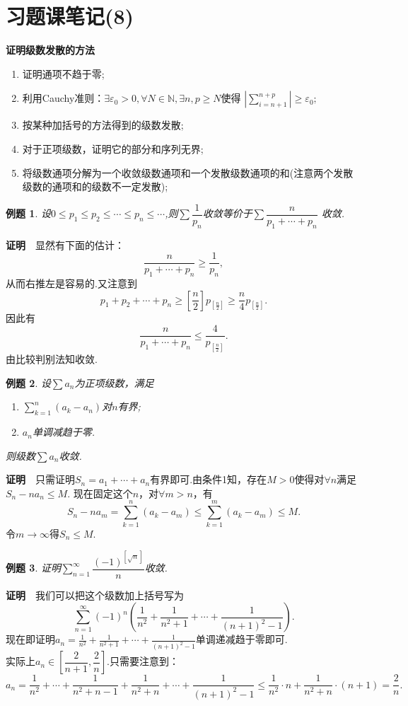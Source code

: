 \documentclass[UTF8]{article}
\newcommand{\zm}{\textbf{证明}$\quad$}
\newtheorem{exa}{\hspace{2em}例题}[section]
\begin{document}
\section{习题课笔记(8)}
\textbf{证明级数发散的方法}
\begin{enumerate}
  \item 证明通项不趋于零;
  \item 利用Cauchy准则：$\exists\varepsilon_0>0,\forall N\in \mathbb{N},\exists n,p\ge N$使得
  $|\sum_{i=n+1}^{n+p}|\ge\varepsilon_0;$
  \item 按某种加括号的方法得到的级数发散;
  \item 对于正项级数，证明它的部分和序列无界;
  \item 将级数通项分解为一个收敛级数通项和一个发散级数通项的和(注意两个发散级数的通项和的级数不一定发散);
\end{enumerate}
\begin{exa}
  设$0\le p_1\le p_2\le\cdots\le p_n\le\cdots$,则$\sum\dfrac{1}{p_n}$收敛等价于$\sum\dfrac{n}{p_1+\cdots+p_n}$
  收敛.
\end{exa}
\zm 显然有下面的估计：
$$\frac{n}{p_1+\cdots+p_n}\ge\frac{1}{p_n},$$
从而右推左是容易的.又注意到
$$p_1+p_2+\cdots+p_n\ge[\frac{n}{2}]p_{[\frac{n}{2}]}\ge\frac{n}{4}p_{[\frac{n}{2}]}.$$
因此有
$$\frac{n}{p_1+\cdots+p_n}\le\frac{4}{p_{[\frac{n}{2}]}}.$$
由比较判别法知收敛.
\begin{exa}
  设$\sum a_n$为正项级数，满足
  \begin{enumerate}
    \item $\sum_{k=1}^n(a_k-a_n)$对$n$有界;
    \item $a_n$单调减趋于零.
  \end{enumerate}
  则级数$\sum a_n$收敛.
\end{exa}
\zm 只需证明$S_n=a_1+\cdots+a_n$有界即可.由条件1知，存在$M>0$使得对$\forall n$满足$S_n-na_n\le M.$
现在固定这个$n$，对$\forall m>n$，有
$$S_n-na_m=\sum_{k=1}^n(a_k-a_m)\le\sum_{k=1}^m(a_k-a_m)\le M.$$
令$m\to\infty$得$S_n\le M.$
\begin{exa}
  证明$\sum\limits_{n=1}^\infty\dfrac{(-1)^{[\sqrt{n}]}}{n}$收敛.
\end{exa}
\zm 我们可以把这个级数加上括号写为
$$\sum_{n=1}^\infty (-1)^n\left(\frac{1}{n^2}+\frac{1}{n^2+1}+\cdots+\frac{1}{(n+1)^2-1}\right).$$
现在即证明$a_n=\frac{1}{n^2}+\frac{1}{n^2+1}+\cdots+\frac{1}{(n+1)^2-1}$单调递减趋于零即可.\\
实际上$a_n\in[\dfrac{2}{n+1},\dfrac{2}{n}].$只需要注意到：
$$a_n=\frac{1}{n^2}+\cdots+\frac{1}{n^2+n-1}+\frac{1}{n^2+n}+\cdots+\frac{1}{(n+1)^2-1}
\le\frac{1}{n^2}\cdot n+\frac{1}{n^2+n}\cdot(n+1)=\frac{2}{n}.$$
\end{document}
